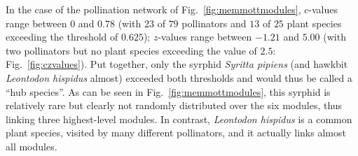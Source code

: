 \documentclass[a4paper, 11pt]{article}\usepackage[]{graphicx}\usepackage[]{color}
\begin{document}
In the case of the pollination network of Fig.~\ref{fig:memmottmodules}, $c$-values range between $0$ and $0.78$ (with $23$ of $79$ pollinators and $13$ of $25$ plant species exceeding the threshold of $0.625$); $z$-values range between $-1.21$ and $5.00$ (with two pollinators but no plant species exceeding the value of $2.5$: Fig.~\ref{fig:czvalues}). Put together, only the syrphid \emph{Syritta pipiens} (and hawkbit \emph{Leontodon hispidus} almost) exceeded both thresholds and would thus be called a ``hub species''. As can be seen in Fig.~\ref{fig:memmottmodules}, this syrphid is relatively rare but clearly not randomly distributed over the six modules, thus linking three highest-level modules. In contrast, \emph{Leontodon hispidus} is a common plant species, visited by many different pollinators, and it actually links almost all modules. 
\end{document}
